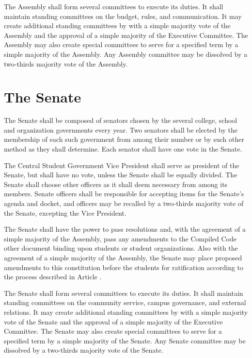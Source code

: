     The Assembly shall form several committees to execute its duties. It shall maintain standing committees on the budget, rules, and communication. It may create additional standing committees by with a simple majority vote of the Assembly and the approval of a simple majority of the Executive Committee. The Assembly may also create special committees to serve for a specified term by a simple majority of the Assembly. Any Assembly committee may be dissolved by a two-thirds majority vote of the Assembly.


\section{The Senate}
    The Senate shall be composed of senators chosen by the several college, school and organization governments every year. Two senators shall be elected by the membership of each such government from among their number or by such other method as they shall determine. Each senator shall have one vote in the Senate.

    The Central Student Government Vice President shall serve as president of the Senate, but shall have no vote, unless the Senate shall be equally divided. The Senate shall choose other officers as it shall deem necessary from among its members. Senate officers shall be responsible for accepting items for the Senate's agenda and docket, and officers may be recalled by a two-thirds majority vote of the Senate, excepting the Vice President.

    The Senate shall have the power to pass resolutions and, with the agreement of a simple majority of the Assembly, pass any amendments to the Compiled Code other document binding upon students or student organizations. Also with the agreement of a simple majority of the Assembly, the Senate may place proposed amendments to this constitution before the students for ratification according to the process described in Article .

    The Senate shall form several committees to execute its duties. It shall maintain standing committees on the community service, campus governance, and external relations. It may create additional standing committees by with a simple majority vote of the Senate and the approval of a simple majority of the Executive Committee. The Senate may also create special committees to serve for a specified term by a simple majority of the Senate. Any Senate committee may be dissolved by a two-thirds majority vote of the Senate.


